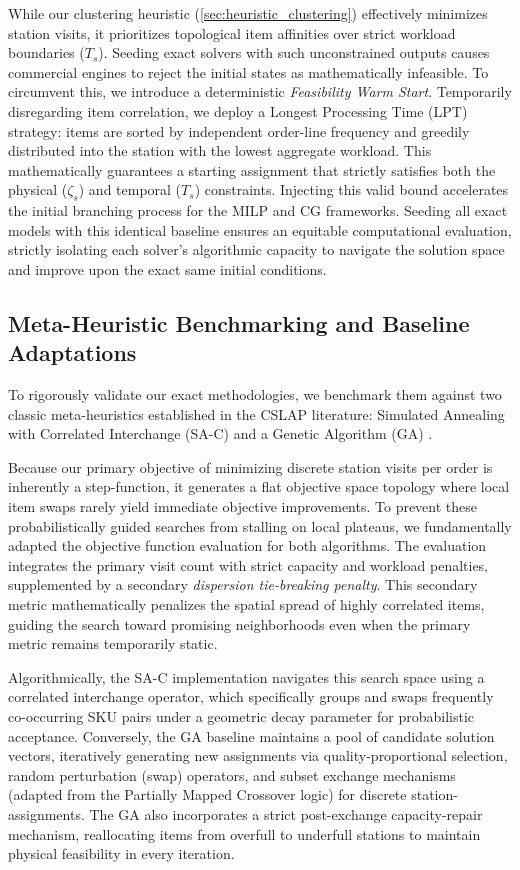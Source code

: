 \documentclass[preprint,review,11pt,authoryear]{elsarticle}
\begin{document}
While our clustering heuristic (\cref{sec:heuristic_clustering}) effectively minimizes station visits, it prioritizes topological item affinities over strict workload boundaries ($T_s$). Seeding exact solvers with such unconstrained outputs causes commercial engines to reject the initial states as mathematically infeasible. To circumvent this, we introduce a deterministic \textit{Feasibility Warm Start}. Temporarily disregarding item correlation, we deploy a Longest Processing Time (LPT) strategy: items are sorted by independent order-line frequency and greedily distributed into the station with the lowest aggregate workload. This mathematically guarantees a starting assignment that strictly satisfies both the physical ($\zeta_s$) and temporal ($T_s$) constraints. Injecting this valid bound accelerates the initial branching process for the MILP and CG frameworks. Seeding all exact models with this identical baseline ensures an equitable computational evaluation, strictly isolating each solver's algorithmic capacity to navigate the solution space and improve upon the exact same initial conditions.



\subsection{Meta-Heuristic Benchmarking and Baseline Adaptations}
\label{sec:meta_benchmarking}

To rigorously validate our exact methodologies, we benchmark them against two classic meta-heuristics established in the CSLAP literature: Simulated Annealing with Correlated Interchange (SA-C) \cite{kim2012, zhang2019cie} and a Genetic Algorithm (GA) \cite{pan2015}. 

Because our primary objective of minimizing discrete station visits per order is inherently a step-function, it generates a flat objective space topology where local item swaps rarely yield immediate objective improvements. To prevent these probabilistically guided searches from stalling on local plateaus, we fundamentally adapted the objective function evaluation for both algorithms. The evaluation integrates the primary visit count with strict capacity and workload penalties, supplemented by a secondary \textit{dispersion tie-breaking penalty}. This secondary metric mathematically penalizes the spatial spread of highly correlated items, guiding the search toward promising neighborhoods even when the primary metric remains temporarily static.

Algorithmically, the SA-C implementation navigates this search space using a correlated interchange operator, which specifically groups and swaps frequently co-occurring SKU pairs under a geometric decay parameter for probabilistic acceptance. Conversely, the GA baseline maintains a pool of candidate solution vectors, iteratively generating new assignments via quality-proportional selection, random perturbation (swap) operators, and subset exchange mechanisms (adapted from the Partially Mapped Crossover logic) for discrete station-assignments. The GA also incorporates a strict post-exchange capacity-repair mechanism, reallocating items from overfull to underfull stations to maintain physical feasibility in every iteration.
\end{document}
